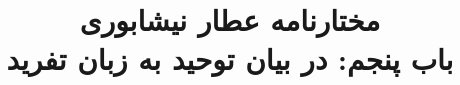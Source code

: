 \documentclass[14pt,b5paper]{article}
\begin{document}
\title{\Huge مختارنامه عطار نیشابوری \\
باب پنجم: در بیان توحید به زبان تفرید}
\author{ }
\date{ }
\maketitle
\newpage
\tableofcontents
\newpage

\newpage

\newpage

\newpage

\newpage

\newpage

\newpage

\newpage

\newpage

\newpage

\newpage

\newpage

\newpage

\newpage
\end{document}
